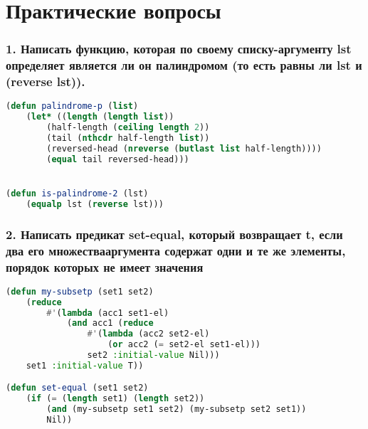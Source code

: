 \section*{Практические вопросы}



\subsubsection*{1. Написать функцию, которая по своему списку-аргументу lst определяет является ли он палиндромом (то есть равны ли lst и (reverse lst)).}


\begin{lstlisting}[language=Lisp]
(defun palindrome-p (list)
	(let* ((length (length list))
		(half-length (ceiling length 2))
		(tail (nthcdr half-length list))
		(reversed-head (nreverse (butlast list half-length))))
		(equal tail reversed-head)))


(defun is-palindrome-2 (lst)
	(equalp lst (reverse lst)))
\end{lstlisting}


\subsubsection*{2. Написать предикат set-equal, который возвращает t, если два его множествааргумента содержат одни и те же элементы, порядок которых не имеет значения}





\begin{lstlisting}[language=Lisp]
(defun my-subsetp (set1 set2)
	(reduce
		#'(lambda (acc1 set1-el)
			(and acc1 (reduce
				#'(lambda (acc2 set2-el)
					(or acc2 (= set2-el set1-el))) 
				set2 :initial-value Nil)))
	set1 :initial-value T))

(defun set-equal (set1 set2)
	(if (= (length set1) (length set2))
		(and (my-subsetp set1 set2) (my-subsetp set2 set1))
		Nil))
\end{lstlisting}

\newpage
